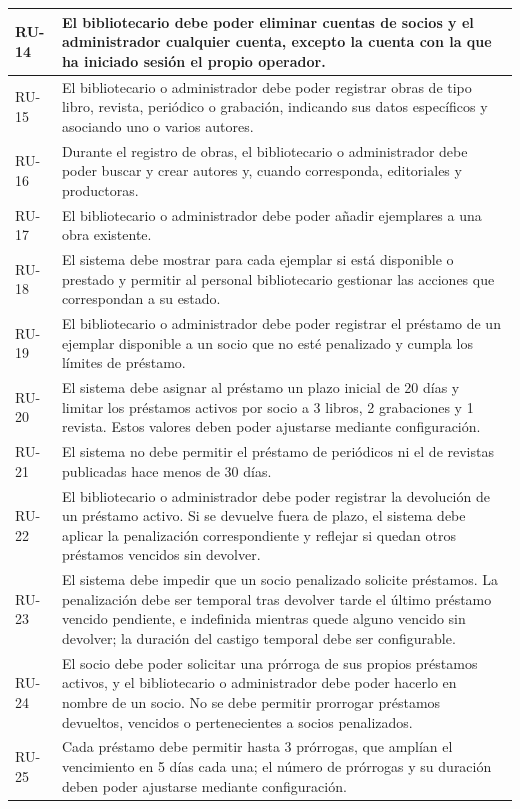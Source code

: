 \documentclass[a4paper,10pt]{article}
\begin{document}
\begin{longtable}{|>{\raggedright\arraybackslash}p{2.8cm}|>{\raggedright\arraybackslash}p{12.2cm}|}
\hline
RU-14 & El bibliotecario debe poder eliminar cuentas de socios y el administrador cualquier cuenta, excepto la cuenta con la que ha iniciado sesión el propio operador. \\
\hline
RU-15 & El bibliotecario o administrador debe poder registrar obras de tipo libro, revista, periódico o grabación, indicando sus datos específicos y asociando uno o varios autores. \\
\hline
RU-16 & Durante el registro de obras, el bibliotecario o administrador debe poder buscar y crear autores y, cuando corresponda, editoriales y productoras. \\
\hline
RU-17 & El bibliotecario o administrador debe poder añadir ejemplares a una obra existente. \\
\hline
RU-18 & El sistema debe mostrar para cada ejemplar si está disponible o prestado y permitir al personal bibliotecario gestionar las acciones que correspondan a su estado. \\
\hline
RU-19 & El bibliotecario o administrador debe poder registrar el préstamo de un ejemplar disponible a un socio que no esté penalizado y cumpla los límites de préstamo. \\
\hline
RU-20 & El sistema debe asignar al préstamo un plazo inicial de 20 días y limitar los préstamos activos por socio a 3 libros, 2 grabaciones y 1 revista. Estos valores deben poder ajustarse mediante configuración. \\
\hline
RU-21 & El sistema no debe permitir el préstamo de periódicos ni el de revistas publicadas hace menos de 30 días. \\
\hline
RU-22 & El bibliotecario o administrador debe poder registrar la devolución de un préstamo activo. Si se devuelve fuera de plazo, el sistema debe aplicar la penalización correspondiente y reflejar si quedan otros préstamos vencidos sin devolver. \\
\hline
RU-23 & El sistema debe impedir que un socio penalizado solicite préstamos. La penalización debe ser temporal tras devolver tarde el último préstamo vencido pendiente, e indefinida mientras quede alguno vencido sin devolver; la duración del castigo temporal debe ser configurable. \\
\hline
RU-24 & El socio debe poder solicitar una prórroga de sus propios préstamos activos, y el bibliotecario o administrador debe poder hacerlo en nombre de un socio. No se debe permitir prorrogar préstamos devueltos, vencidos o pertenecientes a socios penalizados. \\
\hline
RU-25 & Cada préstamo debe permitir hasta 3 prórrogas, que amplían el vencimiento en 5 días cada una; el número de prórrogas y su duración deben poder ajustarse mediante configuración. \\
\hline
\end{longtable}
\end{document}
